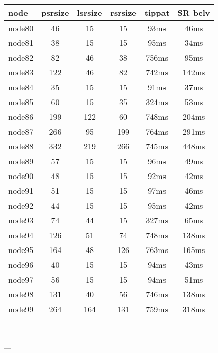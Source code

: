 \begin{tabular}{|l|c|c|c|c|c|}
\hline node & psrsize & lsrsize & rsrsize   & tippat & SR bclv\\
    \hline node80 & 46 & 15 & 15 & 93ms & 46ms\\
    \hline node81 & 38 & 15 & 15 & 95ms & 34ms\\
    \hline node82 & 82 & 46 & 38 & 756ms & 95ms\\
    \hline node83 & 122 & 46 & 82 & 742ms & 142ms\\
    \hline node84 & 35 & 15 & 15 & 91ms & 37ms\\
    \hline node85 & 60 & 15 & 35 & 324ms & 53ms\\
    \hline node86 & 199 & 122 & 60 & 748ms & 204ms\\
    \hline node87 & 266 & 95 & 199 & 764ms & 291ms\\
    \hline node88 & 332 & 219 & 266 & 745ms & 448ms\\
    \hline node89 & 57 & 15 & 15 & 96ms & 49ms\\
    \hline node90 & 48 & 15 & 15 & 92ms & 42ms\\
    \hline node91 & 51 & 15 & 15 & 97ms & 46ms\\
    \hline node92 & 44 & 15 & 15 & 95ms & 42ms\\
    \hline node93 & 74 & 44 & 15 & 327ms & 65ms\\
    \hline node94 & 126 & 51 & 74 & 748ms & 138ms\\
    \hline node95 & 164 & 48 & 126 & 763ms & 165ms\\
    \hline node96 & 40 & 15 & 15 & 94ms & 43ms\\
    \hline node97 & 56 & 15 & 15 & 94ms & 51ms\\
    \hline node98 & 131 & 40 & 56 & 746ms & 138ms\\
    \hline node99 & 264 & 164 & 131 & 759ms & 318ms\\

\hline
\end{tabular} \

---


